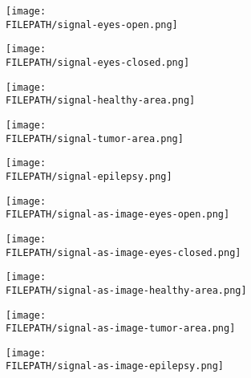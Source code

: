 \documentclass[conference]{IEEEtran}
\providecommand{\FILEPATH}{~/github.com/pbizopoulos/signal2image-modules-in-deep-neural-networks-for-eeg-classification/packages/default/tmp}
\begin{document}
\begin{figure*}[!t]
  \centering
  \begin{subfigure}{0.19\linewidth}
    \centering
    \texttt{[image: \\FILEPATH/signal-eyes-open.png]}
  \end{subfigure}
  \begin{subfigure}{0.19\linewidth}
    \centering
    \texttt{[image: \\FILEPATH/signal-eyes-closed.png]}
  \end{subfigure}
  \begin{subfigure}{0.19\linewidth}
    \centering
    \texttt{[image: \\FILEPATH/signal-healthy-area.png]}
  \end{subfigure}
  \begin{subfigure}{0.19\linewidth}
    \centering
    \texttt{[image: \\FILEPATH/signal-tumor-area.png]}
  \end{subfigure}
  \begin{subfigure}{0.19\linewidth}
    \centering
    \texttt{[image: \\FILEPATH/signal-epilepsy.png]}
  \end{subfigure}

  \begin{subfigure}{0.19\linewidth}
    \centering
    \texttt{[image: \\FILEPATH/signal-as-image-eyes-open.png]}
  \end{subfigure}
  \begin{subfigure}{0.19\linewidth}
    \centering
    \texttt{[image: \\FILEPATH/signal-as-image-eyes-closed.png]}
  \end{subfigure}
  \begin{subfigure}{0.19\linewidth}
    \centering
    \texttt{[image: \\FILEPATH/signal-as-image-healthy-area.png]}
  \end{subfigure}
  \begin{subfigure}{0.19\linewidth}
    \centering
    \texttt{[image: \\FILEPATH/signal-as-image-tumor-area.png]}
  \end{subfigure}
  \begin{subfigure}{0.19\linewidth}
    \centering
    \texttt{[image: \\FILEPATH/signal-as-image-epilepsy.png]}
  \end{subfigure}


\end{figure*}
\end{document}
